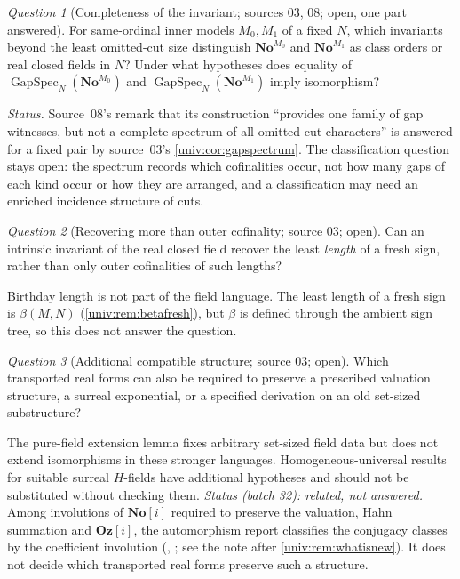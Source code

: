 \documentclass[11pt,letterpaper]{article}
\numberwithin{equation}{section}
\theoremstyle{definition}
\theoremstyle{remark}
\newtheorem{question}[question]{Question}
\newcommand{\No}{\mathbf{No}}
\newcommand{\GapSpec}{\operatorname{GapSpec}}
\begin{document}
\begin{question}[Completeness of the invariant; sources 03, 08; open, one part answered]\label{univ:q:completeness}
For same-ordinal inner models $M_0,M_1$ of a fixed $N$, which invariants beyond
the least omitted-cut size distinguish $\No^{M_0}$ and $\No^{M_1}$ as class
orders or real closed fields in $N$? Under what hypotheses does equality of
$\GapSpec_N(\No^{M_0})$ and $\GapSpec_N(\No^{M_1})$ imply isomorphism?
\end{question}
\emph{Status.} Source~08's remark that its construction ``provides one family of
gap witnesses, but not a complete spectrum of all omitted cut characters'' is
answered for a fixed pair by source~03's \cref{univ:cor:gapspectrum}. The
classification question stays open: the spectrum records which cofinalities
occur, not how many gaps of each kind occur or how they are arranged, and a
classification may need an enriched incidence structure of cuts.

\begin{question}[Recovering more than outer cofinality; source 03; open]\label{univ:q:length}
Can an intrinsic invariant of the real closed field recover the least
\emph{length} of a fresh sign, rather than only outer cofinalities of such
lengths?
\end{question}
Birthday length is not part of the field language. The least length of a fresh
sign is $\beta(M,N)$ (\cref{univ:rem:betafresh}), but $\beta$ is defined through
the ambient sign tree, so this does not answer the question.

\begin{question}[Additional compatible structure; source 03; open]\label{univ:q:compatible}
Which transported real forms can also be required to preserve a prescribed
valuation structure, a surreal exponential, or a specified derivation on an old
set-sized substructure?
\end{question}
The pure-field extension lemma fixes arbitrary set-sized field data but does not
extend isomorphisms in these stronger languages. Homogeneous-universal results
for suitable surreal $H$-fields \cite{vdDE2018} have additional hypotheses and
should not be substituted without checking them.
\emph{Status (batch 32): related, not answered.} Among involutions of $\No[i]$
required to preserve the valuation, Hahn summation and $\mathbf{Oz}[i]$, the
automorphism report classifies the conjugacy classes by the coefficient
involution (, ;
see the note after \cref{univ:rem:whatisnew}). It does not decide which
transported real forms preserve such a structure.
\end{document}
